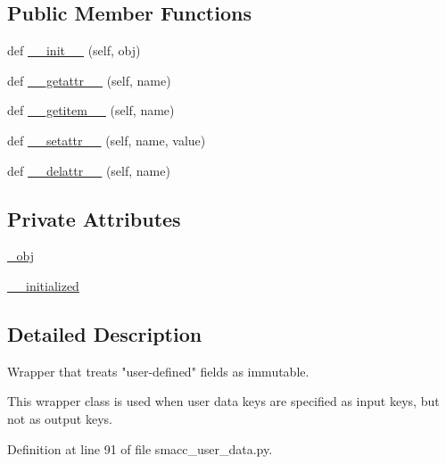 \subsection*{Public Member Functions}
\begin{DoxyCompactItemize}
\item 
def \hyperlink{classsmacc__viewer_1_1smacc__user__data_1_1Const_a422f76102dea3733faffac0e4af0d6fd}{\+\_\+\+\_\+init\+\_\+\+\_\+} (self, obj)
\item 
def \hyperlink{classsmacc__viewer_1_1smacc__user__data_1_1Const_aedc649c1c6d8d10574181d6541b4146d}{\+\_\+\+\_\+getattr\+\_\+\+\_\+} (self, name)
\item 
def \hyperlink{classsmacc__viewer_1_1smacc__user__data_1_1Const_a98a3eea1c7129a0a5354d62379d7d616}{\+\_\+\+\_\+getitem\+\_\+\+\_\+} (self, name)
\item 
def \hyperlink{classsmacc__viewer_1_1smacc__user__data_1_1Const_a3370938545c3c4657c3b8e8ef0de1b68}{\+\_\+\+\_\+setattr\+\_\+\+\_\+} (self, name, value)
\item 
def \hyperlink{classsmacc__viewer_1_1smacc__user__data_1_1Const_a4fd35fef67aba21759e7276bd634ae76}{\+\_\+\+\_\+delattr\+\_\+\+\_\+} (self, name)
\end{DoxyCompactItemize}
\subsection*{Private Attributes}
\begin{DoxyCompactItemize}
\item 
\hyperlink{classsmacc__viewer_1_1smacc__user__data_1_1Const_aa266d546b40f3d7a38577c6f01ae253c}{\+\_\+obj}
\item 
\hyperlink{classsmacc__viewer_1_1smacc__user__data_1_1Const_a3a91d9e0fbdb1881cc0f9c1a2e5b52a8}{\+\_\+\+\_\+initialized}
\end{DoxyCompactItemize}


\subsection{Detailed Description}
\begin{DoxyVerb}Wrapper that treats "user-defined" fields as immutable.

This wrapper class is used when user data keys are specified as input keys,
but not as output keys.
\end{DoxyVerb}
 

Definition at line 91 of file smacc\+\_\+user\+\_\+data.\+py.




